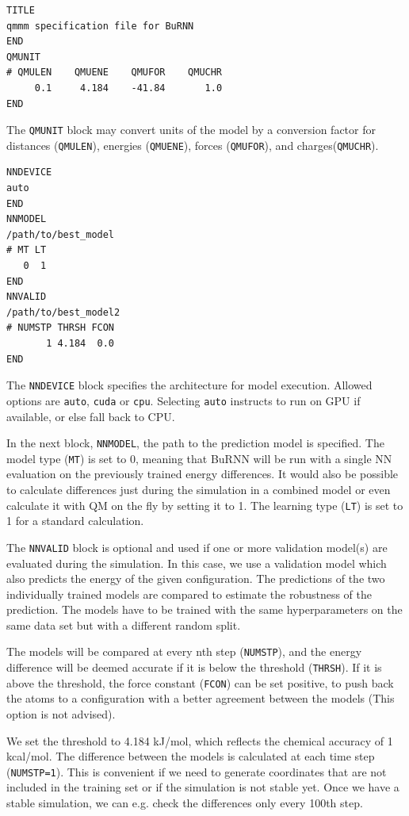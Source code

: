 \begin{lstlisting}[breaklines=true, breakatwhitespace=false]
TITLE
qmmm specification file for BuRNN  
END
QMUNIT
# QMULEN    QMUENE    QMUFOR    QMUCHR
     0.1     4.184    -41.84       1.0
END
\end{lstlisting}

The \texttt{QMUNIT} block may convert units of the model by a conversion factor for distances (\texttt{QMULEN}), energies (\texttt{QMUENE}), forces (\texttt{QMUFOR}), and charges(\texttt{QMUCHR}).

\begin{lstlisting}[breaklines=true, breakatwhitespace=false]
NNDEVICE
auto
END
NNMODEL
/path/to/best_model
# MT LT
   0  1
END
NNVALID
/path/to/best_model2
# NUMSTP THRSH FCON 
       1 4.184  0.0
END
\end{lstlisting}


The \texttt{NNDEVICE} block specifies the architecture for model execution. Allowed options are \texttt{auto}, \texttt{cuda} or \texttt{cpu}. Selecting \texttt{auto} instructs to run on GPU if available, or else fall back to CPU.

In the next block, \texttt{NNMODEL}, the path to the prediction model is specified. The model type (\texttt{MT}) is set to 0, meaning that BuRNN will be run with a single NN evaluation on the previously trained energy differences. It would also be possible to calculate differences just during the simulation in a combined model or even calculate it with QM on the fly by setting it to 1. The learning type (\texttt{LT}) is set to 1 for a standard calculation. 

The \texttt{NNVALID} block is optional and used if one or more validation model(s) are evaluated during the simulation. In this case, we use a validation model which also predicts the energy of the given configuration. The predictions of the two individually trained models are compared to estimate the robustness of the prediction. The models have to be trained with the same hyperparameters on the same data set but with a different random split.

The models will be compared at every nth step (\texttt{NUMSTP}), and the energy difference will be deemed accurate if it is below the threshold (\texttt{THRSH}). If it is above the threshold, the force constant (\texttt{FCON}) can be set positive, to push back the atoms to a configuration with a better agreement between the models (This option is not advised). 

We set the threshold to 4.184 kJ/mol, which reflects the chemical accuracy of 1 kcal/mol. The difference between the models is calculated at each time step (\texttt{NUMSTP=1}). This is convenient if we need to generate coordinates that are not included in the training set or if the simulation is not stable yet. Once we have a stable simulation, we can e.g. check the differences only every 100th step.


